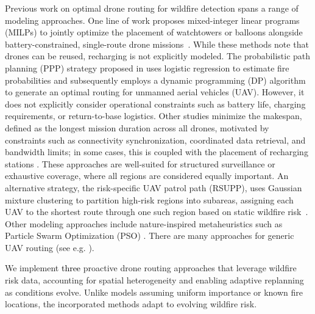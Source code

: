 \documentclass{article}
\newcommand{\rev}[1]{\textcolor{black}{#1}}
\newcommand{\blue}[1]{\textcolor{black}{#1}}
\begin{document}
Previous work on optimal drone routing for wildfire detection spans a range of modeling approaches. One line of work proposes mixed-integer linear programs (MILPs) to jointly optimize the placement of watchtowers or balloons alongside battery-constrained, single-route drone missions~\citep{DroneroutingDeLaFuente}. While these methods note that drones can be reused, recharging is not explicitly modeled. The probabilistic path planning (PPP) strategy proposed in \cite{fire7070254} uses logistic regression to estimate fire probabilities and subsequently employs a dynamic programming (DP) algorithm to generate an optimal routing for unmanned aerial vehicles (UAV). However, it does not explicitly consider operational constraints such as battery life, charging requirements, or return-to-base logistics. Other studies minimize the makespan, defined as the longest mission duration across all drones, motivated by constraints such as connectivity synchronization, coordinated data retrieval, and bandwidth limits; in some cases, this is coupled with the placement of recharging stations \citep{DroneroutingSantin, DroneroutingJemmali}. These approaches are well-suited for structured surveillance or exhaustive coverage, where all regions are considered equally important. An alternative strategy, the risk-specific UAV patrol path (RSUPP), uses Gaussian mixture clustering to partition high-risk regions into subareas, assigning each UAV to the shortest route through one such region based on static wildfire risk~\citep{DroneroutingXu}.
Other modeling approaches include nature-inspired metaheuristics such as Particle Swarm Optimization (PSO) \cite{DroneroutingYan}. There are many approaches for generic UAV routing (see e.g. \citep{drones9040263, s23031463, rs16214019}).

We implement \blue{three} proactive drone routing approaches that leverage wildfire risk data, accounting for spatial heterogeneity and enabling adaptive replanning as conditions evolve. Unlike models assuming uniform importance or known fire locations, the incorporated methods adapt to evolving wildfire risk. 
\end{document}
